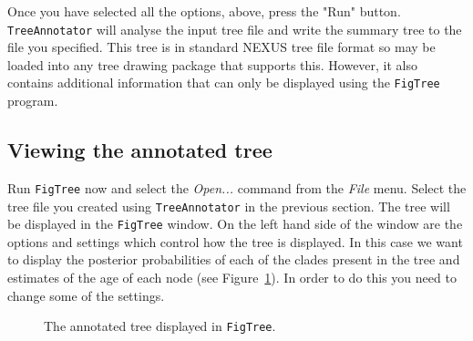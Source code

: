 \documentclass[cup7b, english]{cupbook}
\begin{document}
Once you have selected all the options, above, press the "Run" button. \texttt{TreeAnnotator} will analyse
the input tree file and write the summary tree to the file you specified. This tree is in
standard NEXUS tree file format so may be loaded into any tree drawing package that supports this.
However, it also contains additional information that can only be displayed using the \texttt{FigTree}
program.

\subsection{Viewing the annotated tree}

Run \texttt{FigTree} now and select the {\it Open...} command from the {\it File} menu. Select the tree file
you created using \texttt{TreeAnnotator} in the previous section. The tree will be displayed in the \texttt{FigTree}
window. On the left hand side of the window are the options and settings which control how the
tree is displayed. In this case we want to display the posterior probabilities of each of the clades
present in the tree and estimates of the age of each node (see Figure~\ref{fig:figure11}). In order
to do this you need to change some of the settings.

\begin{figure}[htbp]
\begin{center}
\leavevmode
{}
\end{center}
\caption{The annotated tree displayed in \texttt{FigTree}.}
\label{fig:figure11}
\end{figure}
\end{document}

